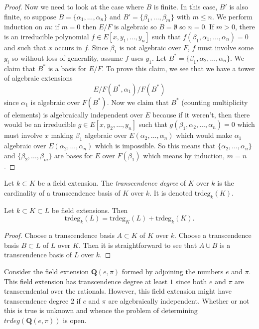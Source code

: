 \begin{proof}
\medskip\noindent
Now we need to look at the case where $B$ is finite.
In this case, $B'$ is also finite, so suppose
$B = \{\alpha_1, \ldots, \alpha_n\}$ and
$B' = \{\beta_1, \ldots, \beta_m\}$ with $m \leq n$.
We perform induction on $m$: if $m = 0$ then $E/F$ is algebraic so
$B = \emptyset$ so $n = 0$. If $m > 0$, there is an irreducible polynomial
$f \in E[x, y_1, \ldots, y_n]$ such that
$f(\beta_1, \alpha_1, \ldots, \alpha_n) = 0$ and such that $x$ occurs in $f$.
Since $\beta_1$ is not algebraic over $F$, $f$ must involve some $y_i$
so without loss of generality, assume $f$ uses $y_1$.
Let $B^* = \{\beta_1, \alpha_2, \ldots, \alpha_n\}$.
We claim that $B^*$ is a basis for $E/F$. To prove this claim, we see that
we have a tower of algebraic extensions
$$
E/ F(B^*, \alpha_1) / F(B^*)
$$
since $\alpha_1$ is algebraic over $F(B^*)$.
Now we claim that $B^*$ (counting multiplicity of elements) is
algebraically independent over $E$ because if it weren't, then there would be an
irreducible $g\in E[x, y_2, \ldots, y_n]$ such that
$g(\beta_1, \alpha_2, \ldots, \alpha_n) = 0$
which must involve $x$ making $\beta_1$
algebraic over $E(\alpha_2, \ldots, \alpha_n)$ which would make $\alpha_1$
algebraic over $E(\alpha_2, \ldots, \alpha_n)$ which is impossible.
So this means that $\{\alpha_2, \ldots, \alpha_n\}$ and
$\{\beta_2, \ldots, \beta_m\}$ are bases for $E$ over $F(\beta_1)$
which means by induction, $m = n$. 
\end{proof}

\begin{definition}
\label{definition-transcendence-degree}
Let $k \subset K$ be a field extension.
The {\it transcendence degree} of $K$ over $k$ is
the cardinality of a transcendence basis of $K$ over $k$.
It is denoted $\text{trdeg}_k(K)$.
\end{definition}

\begin{lemma}
\label{lemma-transcendence-degree-tower}
Let $k \subset K \subset L$ be field extensions.
Then
$$
\text{trdeg}_k(L) =
\text{trdeg}_K(L) +
\text{trdeg}_k(K).
$$
\end{lemma}

\begin{proof}
Choose a transcendence basis $A \subset K$ of $K$ over $k$.
Choose a transcendence basis $B \subset L$ of $L$ over $K$.
Then it is straightforward to see that $A \cup B$ is a transcendence
basis of $L$ over $k$.
\end{proof}

\begin{example}
\label{example-pi-e-transcendental}
Consider the field extension $\mathbf{Q}(e, \pi)$ formed by
adjoining the numbers $e$ and $\pi$. This field extension has transcendence
degree at least $1$ since both $e$ and $\pi$ are transcendental over the
rationals. However, this field extension might have transcendence
degree $2$ if $e$ and $\pi$ are algebraically independent. Whether or
not this is true is unknown and whence the problem of determining
$trdeg(\mathbf{Q}(e, \pi))$ is open.
\end{example}

